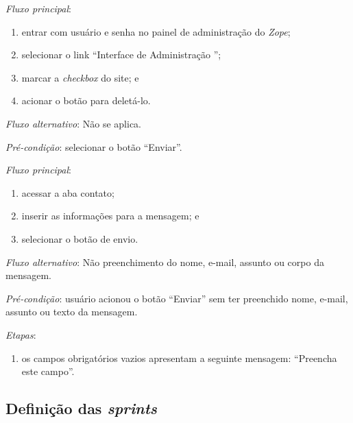 \noindent \textit{Fluxo principal}:

\begin{enumerate}
    \item entrar com usuário e senha no painel de administração do \textit{Zope};
    \item selecionar o link ``Interface de Administração '';
    \item marcar a \textit{checkbox} do site; e
    \item acionar o botão para deletá-lo.
\end{enumerate}

\noindent \textit{Fluxo alternativo}: Não se aplica.



\vspace{0.7cm}

\noindent \textit{Pré-condição}: selecionar o botão ``Enviar''.

\noindent \textit{Fluxo principal}:

\begin{enumerate}
    \item acessar a aba contato;
    \item inserir as informações para a mensagem; e
    \item selecionar o botão de envio.
\end{enumerate}

\noindent \textit{Fluxo alternativo}: Não preenchimento do nome, e-mail, assunto ou corpo da mensagem.

\noindent \textit{Pré-condição}: usuário acionou o botão ``Enviar'' sem ter preenchido nome, e-mail, assunto ou texto da mensagem.

\noindent \textit{Etapas}:

\begin{enumerate}
    \item os campos obrigatórios vazios apresentam a seguinte mensagem: ``Preencha este campo''.
\end{enumerate}



\hspace{2.5cm}
\subsection{Definição das \textit{sprints}}
\label{subsec:sprints}
\hspace{2.5cm}

